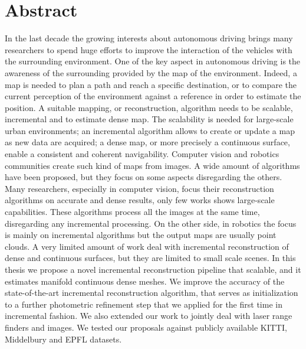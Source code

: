 \chapter*{Abstract}
In the last decade the growing interests about autonomous driving brings many researchers to spend  huge efforts to improve the interaction of the vehicles with the surrounding environment.
One of the key aspect in autonomous driving is the awareness of the surrounding provided by the map of the environment.
Indeed, a map is needed to plan a path and reach a specific destination, or to compare the current perception of the environment against a reference in order to estimate the position.
A suitable mapping, or reconstruction, algorithm needs  to be scalable, incremental and to estimate dense map. The scalability is needed for large-scale urban environments; an incremental algorithm allows to create or update a map  as new data are acquired; a dense map, or more precisely a continuous surface, enable a consistent and coherent navigability.
Computer vision and robotics communities create such kind of maps from images. 
A wide amount of algorithms have been proposed, but they focus on some aspects disregarding the others.
Many researchers, especially in computer vision, focus their reconstruction algorithms on accurate and dense results, only few works shows large-scale capabilities. These algorithms process all the images at the same time, disregarding any incremental processing. 
On the other side, in robotics the focus is mainly on incremental algorithms but the output maps are usually point clouds.
A very limited amount of work deal with incremental reconstruction of dense and continuous surfaces, but they are limited to small scale scenes.
In this thesis we propose a novel incremental reconstruction  pipeline that scalable, and it estimates manifold continuous dense meshes. 
We improve the accuracy of the state-of-the-art incremental reconstruction algorithm, that serves as initialization to a further photometric refinement step that we applied for the first time in incremental fashion. 
We also extended our work to jointly deal with laser range finders and images.
We tested our proposals against publicly available KITTI, Middelbury and EPFL datasets.

